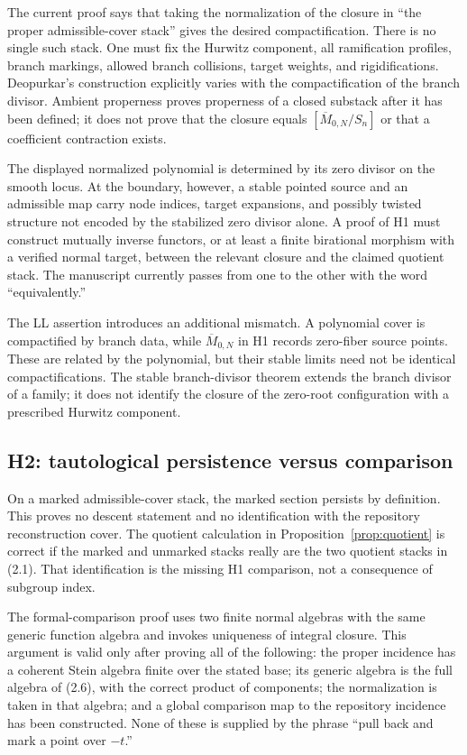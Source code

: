 \documentclass[11pt]{article}
\newcommand{\ol}{\overline}
\begin{document}
The current proof says that taking the normalization of the closure in
``the proper admissible-cover stack'' gives the desired compactification.
There is no single such stack.  One must fix the Hurwitz component, all
ramification profiles, branch markings, allowed branch collisions, target
weights, and rigidifications.  Deopurkar's construction explicitly varies
with the compactification of the branch divisor.  Ambient properness proves
properness of a closed substack after it has been defined; it does not prove
that the closure equals $[\ol M_{0,N}/S_n]$ or that a coefficient contraction
exists.

The displayed normalized polynomial is determined by its zero divisor on
the smooth locus.  At the boundary, however, a stable pointed source and an
admissible map carry node indices, target expansions, and possibly twisted
structure not encoded by the stabilized zero divisor alone.  A proof of H1
must construct mutually inverse functors, or at least a finite birational
morphism with a verified normal target, between the relevant closure and the
claimed quotient stack.  The manuscript currently passes from one to the
other with the word ``equivalently.''

The LL assertion introduces an additional mismatch.  A polynomial cover is
compactified by branch data, while $\ol M_{0,N}$ in H1 records zero-fiber
source points.  These are related by the polynomial, but their stable limits
need not be identical compactifications.  The stable branch-divisor theorem
extends the branch divisor of a family; it does not identify the closure of
the zero-root configuration with a prescribed Hurwitz component.

\subsection{H2: tautological persistence versus comparison}

On a marked admissible-cover stack, the marked section persists by
definition.  This proves no descent statement and no identification with the
repository reconstruction cover.  The quotient calculation in
Proposition~\ref{prop:quotient} is correct if the marked and unmarked stacks
really are the two quotient stacks in (2.1).  That identification is the
missing H1 comparison, not a consequence of subgroup index.

The formal-comparison proof uses two finite normal algebras with the same
generic function algebra and invokes uniqueness of integral closure.  This
argument is valid only after proving all of the following: the proper
incidence has a coherent Stein algebra finite over the stated base; its
generic algebra is the full algebra of (2.6), with the correct product of
components; the normalization is taken in that algebra; and a global
comparison map to the repository incidence has been constructed.  None of
these is supplied by the phrase ``pull back and mark a point over $-t$.''
\end{document}
